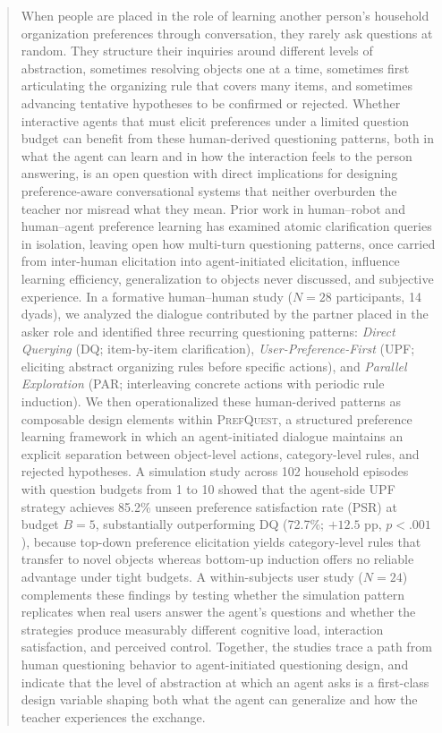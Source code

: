 \documentclass[manuscript,review,anonymous]{acmart}
\begin{document}
\begin{abstract}
When people are placed in the role of learning another person's household organization preferences through conversation, they rarely ask questions at random. They structure their inquiries around different levels of abstraction, sometimes resolving objects one at a time, sometimes first articulating the organizing rule that covers many items, and sometimes advancing tentative hypotheses to be confirmed or rejected. Whether interactive agents that must elicit preferences under a limited question budget can benefit from these human-derived questioning patterns, both in what the agent can learn and in how the interaction feels to the person answering, is an open question with direct implications for designing preference-aware conversational systems that neither overburden the teacher nor misread what they mean. Prior work in human--robot and human--agent preference learning has examined atomic clarification queries in isolation, leaving open how multi-turn questioning patterns, once carried from inter-human elicitation into agent-initiated elicitation, influence learning efficiency, generalization to objects never discussed, and subjective experience. In a formative human--human study ($N = 28$ participants, 14 dyads), we analyzed the dialogue contributed by the partner placed in the asker role and identified three recurring questioning patterns: \textit{Direct Querying} (DQ; item-by-item clarification), \textit{User-Preference-First} (UPF; eliciting abstract organizing rules before specific actions), and \textit{Parallel Exploration} (PAR; interleaving concrete actions with periodic rule induction). We then operationalized these human-derived patterns as composable design elements within \textsc{PrefQuest}, a structured preference learning framework in which an agent-initiated dialogue maintains an explicit separation between object-level actions, category-level rules, and rejected hypotheses. A simulation study across 102 household episodes with question budgets from 1 to 10 showed that the agent-side UPF strategy achieves 85.2\% unseen preference satisfaction rate (PSR) at budget $B = 5$, substantially outperforming DQ (72.7\%; $+12.5$ pp, $p < .001$), because top-down preference elicitation yields category-level rules that transfer to novel objects whereas bottom-up induction offers no reliable advantage under tight budgets. A within-subjects user study ($N = 24$) complements these findings by testing whether the simulation pattern replicates when real users answer the agent's questions and whether the strategies produce measurably different cognitive load, interaction satisfaction, and perceived control. Together, the studies trace a path from human questioning behavior to agent-initiated questioning design, and indicate that the level of abstraction at which an agent asks is a first-class design variable shaping both what the agent can generalize and how the teacher experiences the exchange.
\end{abstract}
\end{document}

